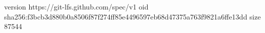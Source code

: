 version https://git-lfs.github.com/spec/v1
oid sha256:f3bcb3d880b0a8506f87f274ff85e4496597eb68d47375a763f9821a6ffe13dd
size 87544

